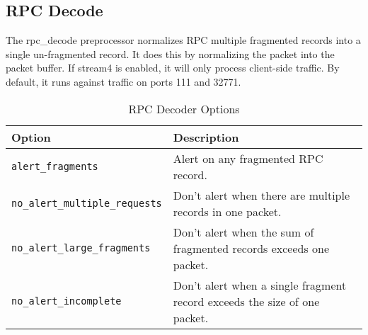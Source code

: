 \documentclass[english]{report}
\newenvironment{note}{
\samepage
    \vspace{10pt}{\textsf{
        {\hspace{7pt}\Huge{$\triangle$\hspace{-12.5pt}{\Large{$^!$}}}}\hspace{5pt}
        {\Large{NOTE}}
    }
    }
   \begin{center}
    \par\vspace{-17pt}

    \begin{lrbox}{\savepar}
    \begin{minipage}[r]{6in}
}
{
    \end{minipage}
    \end{lrbox}
    \fbox{
        \usebox{
            \savepar
	}
    }
    \par\vskip10pt
    \end{center}
}
\newenvironment{note}{
        \begin{rawhtml}
        <p><table border="1"><tr><td><b>
        Note:&nbsp;&nbsp;</b>
        \end{rawhtml}
}{
        \begin{rawhtml}
        </b></td></tr></table></p>
        \end{rawhtml}
}
\begin{document}
%
%
%
%
%

\subsection{RPC Decode\label{sub:rpc-decoder}}

The rpc\_decode preprocessor normalizes RPC multiple fragmented
records into a single un-fragmented record.  It does this by
normalizing the packet into the packet buffer.  If stream4 is
enabled, it will only process client-side traffic.  By default, it runs against
traffic on ports 111 and 32771.

\begin{table}[!hbpt]

\caption{RPC Decoder Options\label{rpc options}}

\begin{center}\begin{tabular}{| l | l |}
\hline 
\textbf{Option}&
\textbf{Description}\\
\hline
\hline 
\texttt{alert\_fragments}&
Alert on any fragmented RPC record.\\
\hline 
\texttt{no\_alert\_multiple\_requests}&
Don't alert when there are multiple records in one packet.\\
\hline 
\texttt{no\_alert\_large\_fragments}&
Don't alert when the sum of fragmented records exceeds one packet.\\
\hline 
\texttt{no\_alert\_incomplete}&
Don't alert when a single fragment record exceeds the size of one
packet.\\
\hline
\end{tabular}\end{center}
\end{table}
\end{document}
